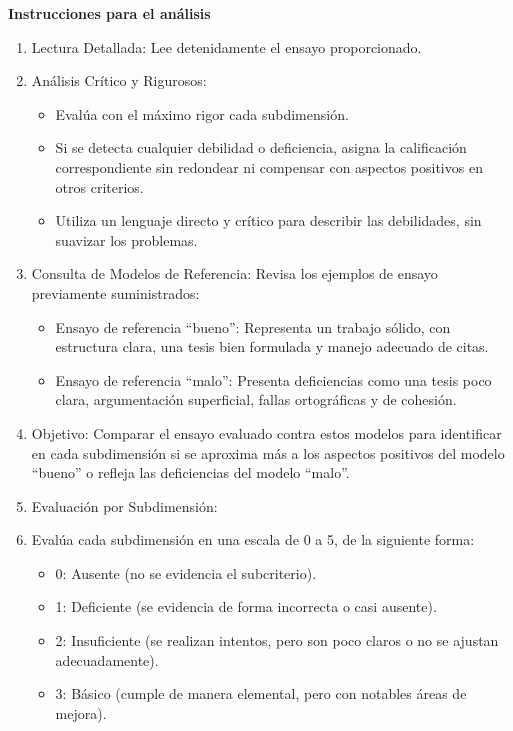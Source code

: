 \documentclass[spanish]{textolivre}
\begin{document}
\medskip

\noindent \textbf{Instrucciones para el análisis}
\begin{enumerate}[label=\arabic*., 
    leftmargin=*,
    widest=99
]
    \item Lectura Detallada: Lee detenidamente el ensayo proporcionado.
    \item Análisis Crítico y Rigurosos:
    \begin{itemize}
        \item Evalúa con el máximo rigor cada subdimensión.
        \item Si se detecta cualquier debilidad o deficiencia, asigna la calificación correspondiente sin redondear ni compensar con aspectos positivos en otros criterios.
        \item Utiliza un lenguaje directo y crítico para describir las debilidades, sin suavizar los problemas.
    \end{itemize}
    \item Consulta de Modelos de Referencia: Revisa los ejemplos de ensayo previamente suministrados:
    \begin{itemize}
        \item Ensayo de referencia ``bueno'': Representa un trabajo sólido, con estructura clara, una tesis bien formulada y manejo adecuado de citas.
        \item Ensayo de referencia ``malo'': Presenta deficiencias como una tesis poco clara, argumentación superficial, fallas ortográficas y de cohesión.
     \end{itemize}
    \item Objetivo: Comparar el ensayo evaluado contra estos modelos para identificar en cada subdimensión si se aproxima más a los aspectos positivos del modelo ``bueno'' o refleja las deficiencias del modelo ``malo''.
    \item Evaluación por Subdimensión:
    \item[] Evalúa cada subdimensión en una escala de 0 a 5, de la siguiente forma:
    \begin{itemize}
        \item 0: Ausente (no se evidencia el subcriterio).
        \item 1: Deficiente (se evidencia de forma incorrecta o casi ausente).
        \item 2: Insuficiente (se realizan intentos, pero son poco claros o no se ajustan adecuadamente).
        \item 3: Básico (cumple de manera elemental, pero con notables áreas de mejora).

\end{itemize}
\end{enumerate}
\end{document}
